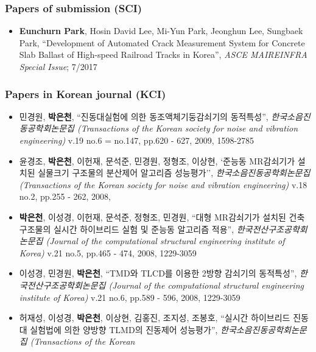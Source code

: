 \subsubsection*{Papers of submission (SCI)}
\begin{itemize}
\item
  \textbf{Eunchurn Park}, Hosin David Lee, Mi-Yun Park, Jeonghun Lee, Sungbaek Park, ``Development of Automated Crack Measurement System for Concrete Slab Ballast of High-speed Railroad Tracks in Korea'', \emph{ASCE MAIREINFRA Special Issue}; 7/2017
\end{itemize}

\subsubsection*{Papers in Korean journal (KCI)}
\begin{itemize}
\item
  민경원, \textbf{박은천}, ``진동대실험에 의한
  동조액체기둥감쇠기의 동적특성'', \emph{한국소음진동공학회논문집
  (Transactions of the Korean society for noise and vibration
  engineering)} v.19 no.6 = no.147, pp.620 - 627, 2009, 1598-2785
\item
  윤경조, \textbf{박은천}, 이헌재, 문석준, 민경원, 정형조, 이상현, `준능동 MR감쇠기가 설치된 실물크기 구조물의 분산제어 알고리즘 성능평가'', \emph{한국소음진동공학회논문집
  (Transactions of the Korean society for noise and vibration
  engineering)} v.18 no.2, pp.255 - 262, 2008,
\item
  \textbf{박은천}, 이성경, 이헌재, 문석준, 정형조, 민경원, ``대형
  MR감쇠기가 설치된 건축구조물의 실시간 하이브리드 실험 및 준능동
  알고리즘 적용'', \emph{한국전산구조공학회논문집 (Journal of the
  computational structural engineering institute of Korea)} v.21 no.5,
  pp.465 - 474, 2008, 1229-3059
\item
  이성경, 민경원, \textbf{박은천}, ``TMD와 TLCD를 이용한 2방향 감쇠기의
  동적특성'', \emph{한국전산구조공학회논문집 (Journal of the
  computational structural engineering institute of Korea)} v.21 no.6,
  pp.589 - 596, 2008, 1229-3059
\item
  허재성, 이성경, \textbf{박은천}, 이상현, 김홍진, 조지성, 조봉호,
  ``실시간 하이브리드 진동대 실험법에 의한 양방향 TLMD의 진동제어
  성능평가'', \emph{한국소음진동공학회논문집 (Transactions of the Korean
}
\end{itemize}
